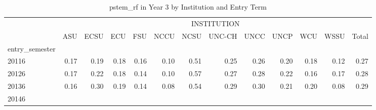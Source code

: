 \begin{table}[!h]
\caption{pstem\_rf in Year 3 by Institution and Entry Term}
\centering
\begin{tabular}{lllllllllllll}
\cline{1-13}
\multicolumn{1}{c}{} &
  \multicolumn{12}{|c}{INSTITUTION} \\
\multicolumn{1}{c}{} &
  \multicolumn{1}{|r}{ASU} &
  \multicolumn{1}{r}{ECSU} &
  \multicolumn{1}{r}{ECU} &
  \multicolumn{1}{r}{FSU} &
  \multicolumn{1}{r}{NCCU} &
  \multicolumn{1}{r}{NCSU} &
  \multicolumn{1}{r}{UNC-CH} &
  \multicolumn{1}{r}{UNCC} &
  \multicolumn{1}{r}{UNCP} &
  \multicolumn{1}{r}{WCU} &
  \multicolumn{1}{r}{WSSU} &
  \multicolumn{1}{r}{Total} \\
\cline{1-13}
\multicolumn{1}{l}{entry\_semester} &
  \multicolumn{1}{|r}{} &
  \multicolumn{1}{r}{} &
  \multicolumn{1}{r}{} &
  \multicolumn{1}{r}{} &
  \multicolumn{1}{r}{} &
  \multicolumn{1}{r}{} &
  \multicolumn{1}{r}{} &
  \multicolumn{1}{r}{} &
  \multicolumn{1}{r}{} &
  \multicolumn{1}{r}{} &
  \multicolumn{1}{r}{} &
  \multicolumn{1}{r}{} \\
\multicolumn{1}{l}{\hspace{1em}20116} &
  \multicolumn{1}{|r}{0.17} &
  \multicolumn{1}{r}{0.19} &
  \multicolumn{1}{r}{0.18} &
  \multicolumn{1}{r}{0.16} &
  \multicolumn{1}{r}{0.10} &
  \multicolumn{1}{r}{0.51} &
  \multicolumn{1}{r}{0.25} &
  \multicolumn{1}{r}{0.26} &
  \multicolumn{1}{r}{0.20} &
  \multicolumn{1}{r}{0.18} &
  \multicolumn{1}{r}{0.12} &
  \multicolumn{1}{r}{0.27} \\
\multicolumn{1}{l}{\hspace{1em}20126} &
  \multicolumn{1}{|r}{0.17} &
  \multicolumn{1}{r}{0.22} &
  \multicolumn{1}{r}{0.18} &
  \multicolumn{1}{r}{0.14} &
  \multicolumn{1}{r}{0.10} &
  \multicolumn{1}{r}{0.57} &
  \multicolumn{1}{r}{0.27} &
  \multicolumn{1}{r}{0.28} &
  \multicolumn{1}{r}{0.22} &
  \multicolumn{1}{r}{0.16} &
  \multicolumn{1}{r}{0.17} &
  \multicolumn{1}{r}{0.28} \\
\multicolumn{1}{l}{\hspace{1em}20136} &
  \multicolumn{1}{|r}{0.16} &
  \multicolumn{1}{r}{0.30} &
  \multicolumn{1}{r}{0.19} &
  \multicolumn{1}{r}{0.14} &
  \multicolumn{1}{r}{0.08} &
  \multicolumn{1}{r}{0.54} &
  \multicolumn{1}{r}{0.29} &
  \multicolumn{1}{r}{0.30} &
  \multicolumn{1}{r}{0.21} &
  \multicolumn{1}{r}{0.20} &
  \multicolumn{1}{r}{0.08} &
  \multicolumn{1}{r}{0.29} \\
\multicolumn{1}{l}{\hspace{1em}20146} &

\end{tabular}
\end{table}
